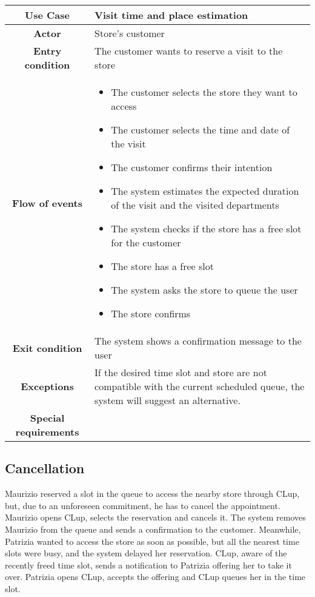 \documentclass[../../main.tex]{subfiles}
\begin{document}
    \begin{table}[H]
      \centering
        \begin{tabular}{c m{}}
        \hline
        \textbf{Use Case} & Visit time and place estimation\\ \hline
        \textbf{Actor} & Store's customer\\ \hline
        \textbf{Entry condition} & The customer wants to reserve a visit to the store\\  \hline
        \textbf{Flow of events} & \begin{itemize}
                                    \item The customer selects the store they want to access
                                    \item The customer selects the time and date of the visit
                                    \item The customer confirms their intention
                                    \item The system estimates the expected duration of the visit and the visited departments
                                    \item The system checks if the store has a free slot for the customer
                                    \item The store has a free slot
                                    \item The system asks the store to queue the user
                                    \item The store confirms
                                  \end{itemize}\\ \hline
        \textbf{Exit condition} & The system shows a confirmation message to the user \\ \hline
        \textbf{Exceptions} & If the desired time slot and store are not compatible with the current scheduled queue, the system will suggest an alternative. \\ \hline
        \textbf{Special requirements} &\\ \hline
        \end{tabular}
    \end{table}

    \subsection*{Cancellation}

    Maurizio reserved a slot in the queue to access the nearby store through CLup, but, due to an unforeseen commitment, 
    he has to cancel the appointment. Maurizio opens CLup, selects the reservation and cancels it. 
    The system removes Maurizio from the queue and sends a confirmation to the customer. 
    Meanwhile, Patrizia wanted to access the store as soon as possible, but all the nearest time slots were busy, 
    and the system delayed her reservation. CLup, aware of the recently freed time slot, sends a notification to Patrizia offering her to take it over. 
    Patrizia opens CLup, accepts the offering and CLup queues her in the time slot.
\end{document}
